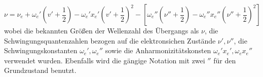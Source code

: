 \begin{equation}
\nu = \nu_e + \omega_e'(v'+\frac{1}{2}) - \omega_e'x_e'(v'+\frac{1}{2})^2 - [\omega_e'' (\nu''+\frac{1}{2})-\omega_e''x_e''(\nu''+\frac{1}{2})^2]
\end{equation}
wobei die bekannten Größen der Wellenzahl des Übergangs als $\nu$, die Schwingungsquantenzahlen bezogen auf die elektronsichen Zustände $\nu',\nu''$, die Schwingungskonstanten $\omega_e',\omega_e''$ sowie die Anharmonizitätskonsten $\omega_e'x_e',\omega_ex_e''$ verwendet wurden. Ebenfalls wird die gängige Notation mit zwei $''
$ für den Grundzustand benutzt. 

%
%
%
%
%
%
